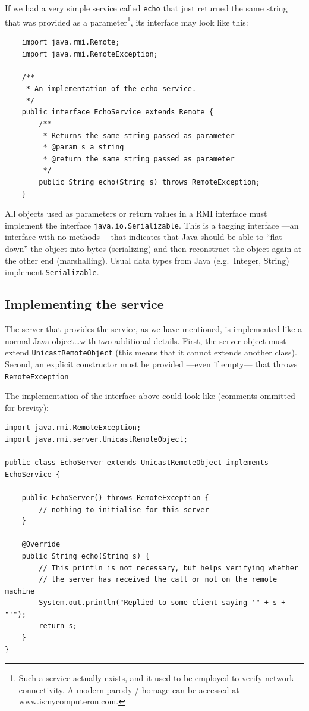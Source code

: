 If we had a very simple service called \verb+echo+ that just returned
the same string that was provided as a parameter\footnote{Such a
  service actually exists, and it used to be employed to verify
  network connectivity. A modern parody / homage can be accessed at
  www.ismycomputeron.com.}, 
its interface may look like this: 

\begin{verbatim}
    import java.rmi.Remote;
    import java.rmi.RemoteException;

    /** 
     * An implementation of the echo service.
     */
    public interface EchoService extends Remote {
        /**
         * Returns the same string passed as parameter
         * @param s a string 
         * @return the same string passed as parameter
         */
        public String echo(String s) throws RemoteException;
    }
\end{verbatim}

All objects used as parameters or return values in a RMI interface
must implement the interface \verb+java.io.Serializable+. This is a
tagging interface ---an interface with no methods--- that indicates
that Java should be able to ``flat down'' the object into bytes
(serializing) and then reconstruct the object again at the other end
(marshalling).  Usual data types from Java (e.g.~Integer, String)
implement \verb+Serializable+.

\subsection{Implementing the service}
\label{sec:implementing-service}

The server that provides the service, 
as we have mentioned, is implemented like a normal Java
object\ldots with two additional details. First, the server object
must extend \verb+UnicastRemoteObject+ (this means that it cannot 
extends another class). Second, an explicit constructor
must be provided ---even if empty--- that throws
\verb+RemoteException+

The implementation of the interface above could look like (comments
ommitted for brevity): 

\begin{verbatim}
import java.rmi.RemoteException;
import java.rmi.server.UnicastRemoteObject;

public class EchoServer extends UnicastRemoteObject implements EchoService {

    public EchoServer() throws RemoteException {
        // nothing to initialise for this server
    }

    @Override
    public String echo(String s) {
        // This println is not necessary, but helps verifying whether 
        // the server has received the call or not on the remote machine 
        System.out.println("Replied to some client saying '" + s + "'");
        return s;
    }
}
\end{verbatim}


